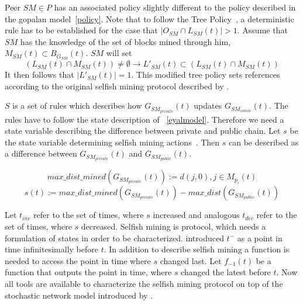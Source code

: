 Peer $SM \in P$ has an associated policy slightly different to the policy described in the gopalan model~\ref{policy}. Note that to follow the Tree Policy~\citep{gopalan}, a deterministic rule has to be established for the case that $|O_{SM} \cap L_{SM}(t)| > 1$.
Assume that $SM$ has the knowledge of the set of blocks mined through him, $M_{SM}(t) \subset B_{G_{SM}}(t)$. $SM$ will set 
\begin{equation}
(L_{SM}(t) \cap M_{SM}(t)) \neq \emptyset \rightarrow L'_{SM}(t) \subset ( L_{SM}(t) \cap M_{SM}(t)) 
\label{smpolicy}
\end{equation}
It then follows that $|L'_{SM}(t)|=1$.
This modified tree policy sets references according to the original selfish mining protocol described by \citeauthor{eyal}.

$S$ is a set of rules which describes how $G_{SM_{private}}(t)$ updates $G_{SM_{comm}}(t)$. The rules have to follow the state description of \citeauthor{eyal}~\ref{eyalmodel}. Therefore we need a state variable describing the difference between private and public chain.
Let $s$ be the state variable determining selfish mining actions~\citep{eyal}.
Then $s$ can be described as a difference between $G_{SM_{private}}(t)$ and $G_{SM_{public}}(t)$.

\begin{equation}
max\_ dist\_mined(G_{SM_{private}}(t)) := d(j,0), j \in M_{p_i}(t)
\end{equation}
\begin{equation}
s(t) := max\_ dist\_mined(G_{SM_{private}}(t)) - max\_ dist(G_{SM_{public}}(t))
\end{equation}

Let $t_{inc}$ refer to the set of times, where $s$ increased and analogous $t_{dec}$ refer to the set of times, where $s$ decreased.
Selfish mining is protocol, which needs a formulation of states in order to be characterized. \citeauthor{gopalan} introduced $t^-$ as a point in time infinitesimally before $t$. In addition to describe selfish mining a function is needed to access the point in time where $s$ changed last.
Let $f_{-1}(t)$ be a function that outputs the point in time, where $s$ changed the latest before $t$.
Now all tools are available to characterize the selfish mining protocol on top of the stochastic network model introduced by \citeauthor{gopalan}.

